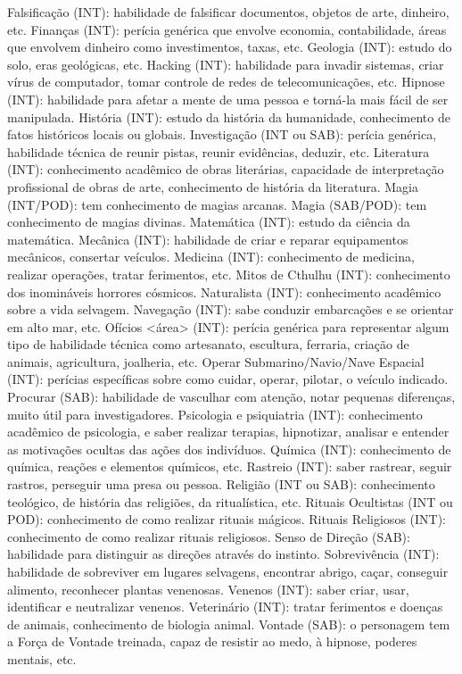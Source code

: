 Falsificação (INT): habilidade de falsificar documentos, objetos de arte, dinheiro, etc.
Finanças (INT): perícia genérica que envolve economia, contabilidade, áreas que envolvem dinheiro como investimentos, taxas, etc.
Geologia (INT): estudo do solo, eras geológicas, etc.
Hacking (INT): habilidade para invadir sistemas, criar vírus de computador, tomar controle de redes de telecomunicações, etc.
Hipnose (INT): habilidade para afetar a mente de uma pessoa e torná-la mais fácil de ser manipulada.
História (INT): estudo da história da humanidade, conhecimento de fatos históricos locais ou globais.
Investigação (INT ou SAB): perícia genérica, habilidade técnica de reunir pistas, reunir evidências, deduzir, etc.
Literatura (INT): conhecimento acadêmico de obras literárias, capacidade de interpretação profissional de obras de arte, conhecimento de história da literatura.
Magia (INT/POD): tem conhecimento de magias arcanas.
Magia (SAB/POD): tem conhecimento de magias divinas. 
Matemática (INT): estudo da ciência da matemática.
Mecânica (INT): habilidade de criar e reparar equipamentos mecânicos, consertar veículos.
Medicina (INT): conhecimento de medicina, realizar operações, tratar ferimentos, etc.
Mitos de Cthulhu (INT): conhecimento dos inomináveis horrores cósmicos.
Naturalista (INT): conhecimento acadêmico sobre a vida selvagem.
Navegação (INT): sabe conduzir embarcações e se orientar em alto mar, etc.
Ofícios <área> (INT): perícia genérica para representar algum tipo de habilidade técnica como artesanato, escultura, ferraria, criação de animais, agricultura, joalheria, etc.
Operar Submarino/Navio/Nave Espacial (INT): perícias específicas sobre como cuidar, operar, pilotar, o veículo indicado.
Procurar (SAB): habilidade de vasculhar com atenção, notar pequenas diferenças, muito útil para investigadores.
Psicologia e psiquiatria (INT): conhecimento acadêmico de psicologia, e saber realizar terapias, hipnotizar, analisar e entender as motivações ocultas das ações dos indivíduos.
Química (INT): conhecimento de química, reações e elementos químicos, etc.
Rastreio (INT): saber rastrear, seguir rastros, perseguir uma presa ou pessoa.
Religião (INT ou SAB): conhecimento teológico, de história das religiões, da ritualística, etc.
Rituais Ocultistas (INT ou POD): conhecimento de como realizar rituais mágicos.
Rituais Religiosos (INT): conhecimento de como realizar rituais religiosos.
Senso de Direção (SAB): habilidade para distinguir as direções através do instinto.
Sobrevivência (INT): habilidade de sobreviver em lugares selvagens, encontrar abrigo, caçar, conseguir alimento, reconhecer plantas venenosas.
Venenos (INT): saber criar, usar, identificar e neutralizar venenos.
Veterinário (INT): tratar ferimentos e doenças de animais, conhecimento de biologia animal.
Vontade (SAB): o personagem tem a Força de Vontade treinada, capaz de resistir ao medo, à hipnose, poderes mentais, etc.

